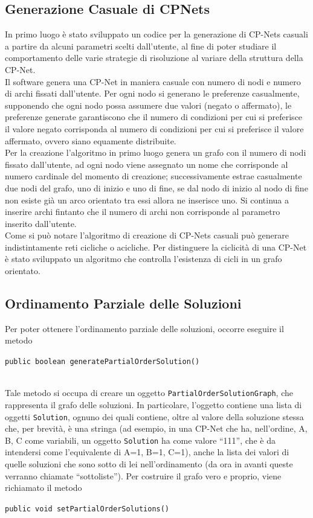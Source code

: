 \documentclass[a4paper,titlepage]{article}
\begin{document}
\subsection{Generazione Casuale di CPNets}
In primo luogo è stato sviluppato un codice per la generazione di CP-Nets casuali a partire da alcuni parametri scelti dall'utente, al fine di poter studiare il comportamento delle varie strategie di risoluzione al variare della struttura della CP-Net.\\
Il software genera una CP-Net in maniera casuale con numero di nodi e numero di archi fissati dall'utente. Per ogni nodo si generano le preferenze casualmente, supponendo che ogni nodo possa assumere due valori (negato o affermato), le preferenze generate garantiscono che il numero di condizioni per cui si preferisce il valore negato corrisponda al numero di condizioni per cui si preferisce il valore affermato, ovvero siano equamente distribuite.\\
Per la creazione l'algoritmo in primo luogo genera un grafo con il numero di nodi fissato dall'utente, ad ogni nodo viene assegnato un nome che corrisponde al numero cardinale del momento di creazione; successivamente estrae casualmente due nodi del grafo, uno di inizio e uno di fine, se dal nodo di inizio al nodo di fine non esiste già un arco orientato tra essi allora ne inserisce uno. Si continua a inserire archi fintanto che il numero di archi non corrisponde al parametro inserito dall'utente.\\
Come si può notare l'algoritmo di creazione di CP-Nets casuali può generare indistintamente reti cicliche o acicliche. Per distinguere la ciclicità di una CP-Net è stato sviluppato un algoritmo che controlla l'esistenza di cicli in un grafo orientato.

\subsection{Ordinamento Parziale delle Soluzioni}

Per poter ottenere l'ordinamento parziale delle soluzioni, occorre eseguire il metodo
\\
\centerline{\texttt{public boolean generatePartialOrderSolution()}}
\\

Tale metodo si occupa di creare un oggetto \texttt{PartialOrderSolutionGraph}, che rappresenta il grafo delle soluzioni. In particolare,  l'oggetto contiene una lista di oggetti \texttt{Solution}, ognuno dei quali contiene, oltre al valore della soluzione stessa che, per brevità, è una stringa (ad esempio, in una CP-Net che ha, nell'ordine, A, B, C come variabili, un oggetto \texttt{Solution} ha come valore ``111'', che è da intendersi come l'equivalente di {A=1, B=1, C=1}), anche la lista dei valori di quelle soluzioni che sono sotto di lei nell'ordinamento (da ora in avanti queste verranno chiamate ``sottoliste'').
Per costruire il grafo vero e proprio, viene richiamato il metodo 
\\
\centerline{\texttt{public void setPartialOrderSolutions()}}
\\
\end{document}
